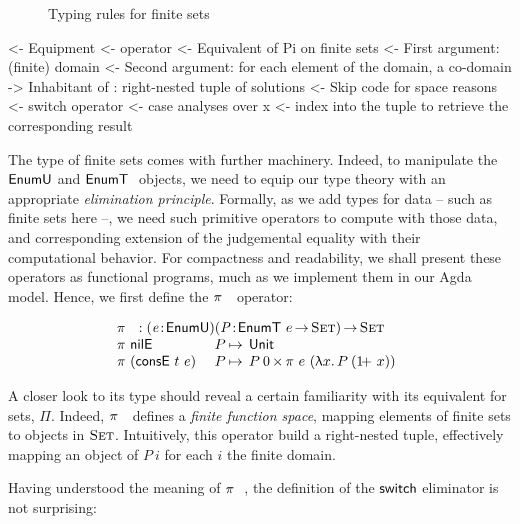 \begin{figure}



\caption{Typing rules for finite sets}
\label{fig:typing-finite-set}

\end{figure}


\begin{wstructure}
<- Equipment
    <- \spi operator
        <- Equivalent of Pi on finite sets
        <- First argument: (finite) domain
        <- Second argument: for each element of the domain, a co-domain
        -> Inhabitant of \spi: right-nested tuple of solutions
            <- Skip code for space reasons
    <- switch operator
        <- case analyses over x
        <- index into the \spi tuple to retrieve the corresponding result
\end{wstructure}

The type of finite sets comes with further machinery. Indeed, to
manipulate the $\EnumU$ and $\EnumT{}$ objects, we need to equip our
type theory with an appropriate \emph{elimination
  principle}. Formally, as we add types for data -- such as finite
sets here --, we need such primitive operators to compute with those
data, and corresponding extension of the judgemental equality with
their computational behavior. For compactness and readability, we
shall present these operators as functional programs, much as we
implement them in our Agda model. Hence, we first define the
$\spi{}{}$ operator:

\[\stk{
\spi{}{} : \PITEL{\V{e}}{\EnumU}
           \PITEL{\V{P}}{\EnumT{e} \To \Set} \To \Set \\
\begin{array}{@{}ll@{\:\mapsto\:\:}l}
\spi{\NilE}{& P}        & \Unit \\
\spi{(\ConsE{t}{e})}{& P} & \TIMES{P\: \Ze}{\spi{e}{(\LAM{x} P\: (\Su{x}))}}
\end{array}
}\]


A closer look to its type should reveal a certain familiarity with its
equivalent for sets, $\Pi$. Indeed, $\spi{}{}$ defines a \emph{finite
  function space}, mapping elements of finite sets to objects in
$\Set$. Intuitively, this operator build a right-nested tuple,
effectively mapping an object of $P\:i$ for each $i$ the finite
domain.

Having understood the meaning of $\spi{}{}$, the definition of the
$\F{switch}$ eliminator is not surprising:


